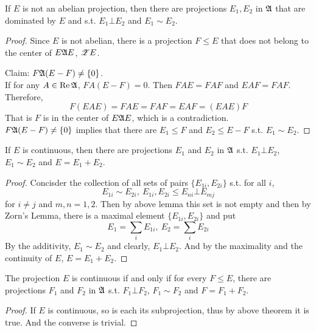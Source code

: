 \begin{lem}
	If $E$ is not an abelian projection, then there are projections $E_1, E_2$ in $\mathfrak{A}$ that are dominated by $E$ and s.t. $E_1 \bot E_2$ and $E_1 \sim E_2$.
\end{lem}
\begin{proof}
	Since $E$ is not abelian, there is a projection $F \leqslant E$ that does not belong to the center of $E \mathfrak{A} E$, $\mathscr{Z}E$.
	\item Claim: $F \mathfrak{A} (E-F) \neq \{0\}$. \\
	If for any $A \in \operatorname{Re}{\mathfrak{A}}$, $F A (E-F) = 0$. Then $FAE = FAF$ and $EAF = FAF$. Therefore,
	\begin{equation*}
		F(EAE) = FAE = FAF = EAF = (EAE)F
	\end{equation*}
	That is $F$ is in the center of $E \mathfrak{A} E$, which is a contradiction.\\
	$F \mathfrak{A} (E-F) \neq \{0\}$ implies that there are $E_1 \leqslant F$ and $E_2 \leqslant E-F$ s.t. $E_1 \sim E_2$.
\end{proof}

\begin{thm}
	If $E$ is continuous, then there are projections $E_1$ and $E_2$ in $\mathfrak{A}$ s.t. $E_1 \bot E_2$, $E_1 \sim E_2$ and $E = E_1 + E_2$.
\end{thm}
\begin{proof}
	Concisder the collection of all sets of pairs $\{E_{1i},E_{2i}\}$ s.t. for all $i$,
	\begin{equation*}
		E_{1i} \sim E_{2i},~ E_{1i},E_{2i} \leqslant E_{ni} \bot E_{mj}
	\end{equation*}
	for $i \neq j$ and $m,n = 1,2$. Then by above lemma this set is not empty and then by Zorn's Lemma, there is a maximal element $\{E_{1i},E_{2i}\}$ and put
	\begin{equation*}
		E_1 = \sum_i E_{1i},~ E_2 = \sum_i E_{2i}
	\end{equation*}
	By the additivity, $E_1 \sim E_2$ and clearly, $E_1 \bot E_2$. And by the maximality and the continuity of $E$, $E = E_1 + E_2$.
\end{proof}

\begin{cor}
	The projection $E$ is continuous if and only if for every $F \leqslant E$, there are projections $F_1$ and $F_2$ in $\mathfrak{A}$ s.t. $F_1 \bot F_2$, $F_1 \sim F_2$ and $F = F_1 + F_2$.
\end{cor}
\begin{proof}
	If $E$ is continuous, so is each its subprojection, thus by above theorem it is true. And the converse is trivial.
\end{proof}

